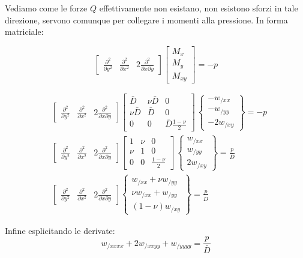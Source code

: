 Vediamo come le forze $Q$ effettivamente non esistano, non esistono sforzi in tale direzione, servono comunque per collegare i momenti alla pressione. In forma matriciale:

\begin{equation*}
\begin{bmatrix} 
\frac{\partial^2}{\partial y^2} & \frac{\partial^2}{\partial x^2} & 2\frac{\partial^2}{\partial x \partial y} 
\end{bmatrix} 
\begin{bmatrix} 
M_x \\ 
M_y \\ 
M_{xy} 
\end{bmatrix} = -p
\end{equation*}

\begin{align*}
    &\begin{bmatrix} 
\frac{\partial^2}{\partial y^2} & \frac{\partial^2}{\partial x^2} & 2\frac{\partial^2}{\partial x \partial y} 
\end{bmatrix} 
\left[
\begin{array}{ccc}
\displaystyle \bar{D} & \displaystyle \nu\bar{D} & \displaystyle 0\\
\displaystyle \nu\bar{D} & \displaystyle \bar{D} & \displaystyle 0 \\
\displaystyle 0& \displaystyle 0 & \displaystyle \bar{D}\frac{1-\nu}{2}
\end{array}
\right]\,
\left\{
\begin{array}{c}
-w_{/xx} \\
-w_{/yy}\\
-2w_{/xy}
\end{array}
\right\}  = -p\\
&\begin{bmatrix} 
\frac{\partial^2}{\partial y^2} & \frac{\partial^2}{\partial x^2} & 2\frac{\partial^2}{\partial x \partial y} 
\end{bmatrix} 
\left[
\begin{array}{ccc}
\displaystyle 1 & \displaystyle \nu & \displaystyle 0\\
\displaystyle \nu& \displaystyle1 & \displaystyle 0 \\
\displaystyle 0& \displaystyle 0 & \displaystyle \frac{1-\nu}{2}
\end{array}
\right]\,
\left\{
\begin{array}{c}
w_{/xx} \\
w_{/yy}\\
2w_{/xy}
\end{array}
\right\}  = \frac{p}{\bar{D} }\\
&\begin{bmatrix} 
\frac{\partial^2}{\partial y^2} & \frac{\partial^2}{\partial x^2} & 2\frac{\partial^2}{\partial x \partial y} 
\end{bmatrix} 
\left\{
\begin{array}{c}
w_{/xx}+\nu w_{/yy} \\
\nu w_{/xx} +w_{/yy}\\
(1-\nu)w_{/xy}
\end{array}
\right\}  = \frac{p}{\bar{D} }
\end{align*}

Infine esplicitando le derivate:
\begin{equation*}
w_{/xxxx} + 2w_{/xxyy} + w_{/yyyy} = \frac{p}{\bar{D}}
\end{equation*}

